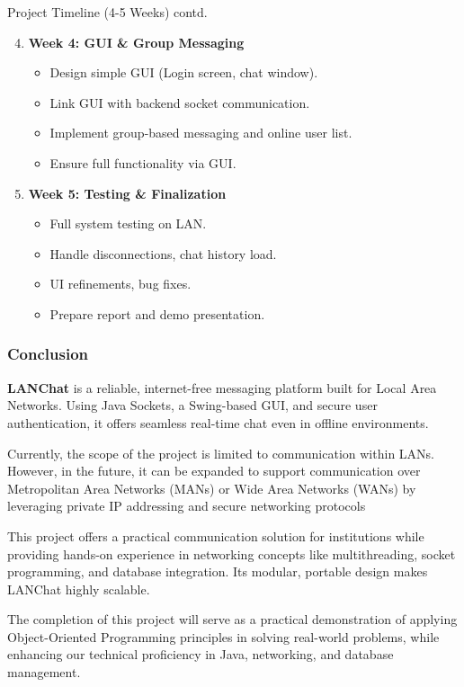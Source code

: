 \documentclass[aspectratio=1610]{beamer}
\begin{document}
\begin{frame}{Project Timeline (4-5 Weeks) contd.}
\small
\begin{enumerate}
    \setcounter{enumi}{3} %
    \item \textbf{Week 4: GUI \& Group Messaging}
    \begin{itemize}
        \item Design simple GUI (Login screen, chat window).
        \item Link GUI with backend socket communication.
        \item Implement group-based messaging and online user list.
        \item Ensure full functionality via GUI.
    \end{itemize}

    \item \textbf{Week 5: Testing \& Finalization}
    \begin{itemize}
        \item Full system testing on LAN.
        \item Handle disconnections, chat history load.
        \item UI refinements, bug fixes.
        \item Prepare report and demo presentation.
    \end{itemize}
\end{enumerate}

\end{frame}


\begin{frame}
\frametitle{Conclusion}

\vspace{0.5cm}

\textbf{LANChat} is a reliable, internet-free messaging platform built for Local Area Networks. Using Java Sockets, a Swing-based GUI, and secure user authentication, it offers seamless real-time chat even in offline environments. 
\vspace{0.3cm}

Currently, the scope of the project is limited to communication within LANs. However, in the future, it can be expanded to support communication over Metropolitan Area Networks (MANs) or Wide Area Networks (WANs) by leveraging private IP addressing and secure networking protocols
\vspace{0.3cm}

This project offers a practical communication solution for institutions while providing hands-on experience in networking concepts like multithreading, socket programming, and database integration. Its modular, portable design makes LANChat highly scalable. 

\vspace{0.3cm}

The completion of this project will serve as a practical demonstration of applying Object-Oriented Programming principles in solving real-world problems, while enhancing our technical proficiency in Java, networking, and database management.

\end{frame}
\end{document}
